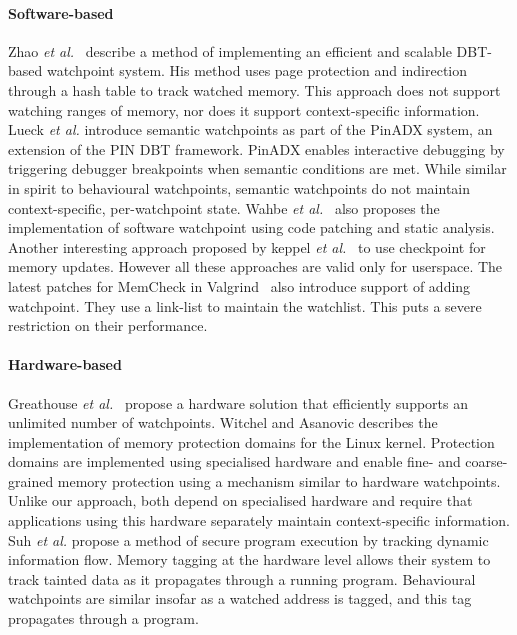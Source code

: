 \paragraph{Software-based} Zhao \emph{et al.}~\cite{Zhao:2008} describe a
method of implementing an efficient and scalable DBT-based watchpoint system.
His method uses page protection and indirection through a hash table to track
watched memory. This approach does not support watching ranges of memory, nor
does it support context-specific information. Lueck \emph{et al.} \cite{PinADX}
introduce semantic watchpoints as part of the PinADX system, an extension of
the PIN DBT framework. PinADX enables interactive debugging by triggering
debugger breakpoints when semantic conditions are met. While similar in spirit
to behavioural watchpoints, semantic watchpoints do not maintain
context-specific, per-watchpoint state. Wahbe \emph{et al.}~\cite{Wahbe:1992}
also proposes the implementation of software watchpoint using code patching and
static analysis.  Another interesting approach proposed by keppel \emph{et
al.}~\cite{Keppel:93a} to use checkpoint for memory updates. However all
these approaches are valid only for userspace. 
The latest patches for MemCheck in Valgrind~\cite{Seward:2005} also introduce
support of adding watchpoint. They use a link-list to maintain the watchlist.
This puts a severe restriction on their performance.   

\paragraph{Hardware-based} Greathouse \emph{et al.}~\cite{UnlimitedWatchpoints}
propose a hardware solution that efficiently supports an unlimited number of
watchpoints. Witchel and Asanovic \cite{Mondrix} describes the implementation
of memory protection domains for the Linux kernel. Protection domains are
implemented using specialised hardware and enable fine- and coarse-grained
memory protection using a mechanism similar to hardware watchpoints. Unlike our
approach, both depend on
specialised hardware and require that applications using this hardware
separately maintain context-specific information. Suh \emph{et al.}
\cite{SecureProgramExecFlowTracking} propose a method of secure program
execution by tracking dynamic information flow. Memory tagging at the hardware
level allows their system to track tainted data as it propagates through a
running program. Behavioural watchpoints are similar insofar as a watched
address is tagged, and this tag propagates through a program.

